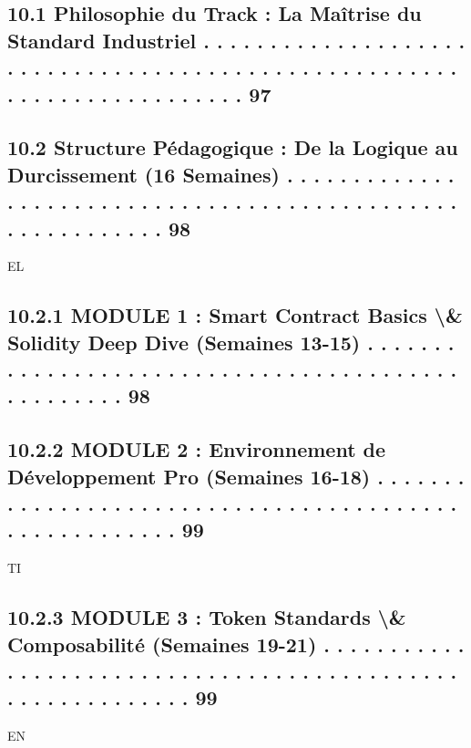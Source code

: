 \subsection{10.1    Philosophie du Track : La Maîtrise du Standard Industriel . . . . . . . . . . . . . . . . . . . . . . . . . . . . . . . . . . . . . . . . . . . . . . . . . . . . . . . . . . . . . . . . . . . . . . . . 97}
\subsection{10.2    Structure Pédagogique : De la Logique au Durcissement (16 Semaines) . . . . . . . . . . . . . . . . . . . . . . . . . . . . . . . . . . . . . . . . . . . . . . . . . . . . . . . . . . . 98}
\vspace{0.5em}
\vspace{0.5em}
\vspace{0.5em}
\vspace{0.5em}
EL\\
\subsection{10.2.1              MODULE 1 : Smart Contract Basics \textbackslash{}& Solidity Deep Dive (Semaines 13-15) . . . . . . . . . . . . . . . . . . . . . . . . . . . . . . . . . . . . . . . . . . . . . . . . . . 98}
\subsection{10.2.2              MODULE 2 : Environnement de Développement Pro (Semaines 16-18) . . . . . . . . . . . . . . . . . . . . . . . . . . . . . . . . . . . . . . . . . . . . . . . . . . . . . . 99}
\vspace{0.5em}
\vspace{0.5em}
\vspace{0.5em}
\vspace{0.5em}
TI\\
\subsection{10.2.3              MODULE 3 : Token Standards \textbackslash{}& Composabilité (Semaines 19-21) . . . . . . . . . . . . . . . . . . . . . . . . . . . . . . . . . . . . . . . . . . . . . . . . . . . . . . . . . . . 99}
\vspace{0.5em}
\vspace{0.5em}
\vspace{0.5em}
\vspace{0.5em}
EN\\
